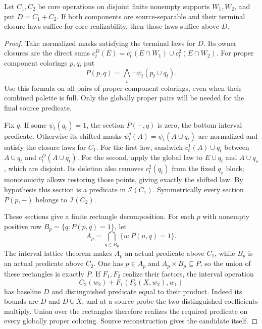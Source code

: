 \begin{lemma}
\label{core:lem:terminal-disjoint-union}
Let $C_1,C_2$ be core operations on disjoint finite nonempty supports
$W_1,W_2$, and put $D=C_1+C_2$.
If both components are source-separable and their terminal closure laws
suffice for core realizability, then those laws suffice above $D$.
\end{lemma}
\begin{proof}
Take normalized masks satisfying the
terminal laws for $D$. Its owner closures are the direct sums
$c_t^D(E)=c_t^1(E\cap W_1)\cup c_t^2(E\cap W_2)$.
For proper component colorings $p,q$, put
\[
 P(p,q)=\bigwedge_t\neg\psi_t(p_t\cup q_t).
\]
Use this formula on all pairs of proper component colorings, even when
their combined palette is full. Only the globally proper pairs will be
needed for the final source predicate.

Fix $q$. If some $\psi_t(q_t)=1$, the section $P(-,q)$ is zero,
the bottom interval predicate. Otherwise its shifted masks
$\psi_t^q(A)=\psi_t(A\cup q_t)$ are normalized and satisfy the
closure laws for $C_1$. For the first law, sandwich
$c_t^1(A)\cup q_t$ between $A\cup q_t$ and
$c_t^D(A\cup q_t)$. For the second, apply the global law to
$E\cup q_t$ and $A\cup q_s$, which are disjoint. Its deletion
also removes $c_t^2(q_t)$ from the fixed $q_s$ block; monotonicity
allows restoring those points, giving exactly the shifted law.
By hypothesis this section is a predicate in $\mathcal I(C_1)$.
Symmetrically every section $P(p,-)$ belongs to $\mathcal I(C_2)$.

These sections give a finite rectangle decomposition. For each $p$ with
nonempty positive row $B_p=\{q:P(p,q)=1\}$, let
\[
 A_p=\bigcap_{q\in B_p}\{u:P(u,q)=1\}.
\]
The interval lattice theorem makes $A_p$ an actual predicate above
$C_1$, while $B_p$ is an actual predicate above $C_2$.
One has $p\in A_p$ and $A_p\times B_p\subseteq P$, so the union
of these rectangles is exactly $P$.
If $F_1,F_2$ realize their factors, the interval operation
\[
 C_2(w_2)+F_1(F_2(X,w_2),w_1)
\]
has baseline $D$ and distinguished predicate equal to their product.
Indeed its bounds are $D$ and $D\cup X$, and at a source probe the
two distinguished coefficients multiply. Union over the rectangles
therefore realizes the required predicate on every globally proper
coloring. Source reconstruction gives the candidate itself.
\end{proof}

